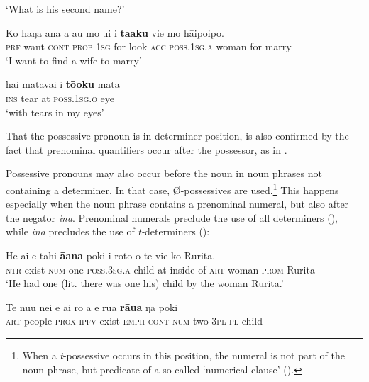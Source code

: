 \glt 
‘What is his second name?’ \textstyleExampleref{[R412.079]} 
\z

\ea\label{ex:6.5}
\gll Ko haŋa {\ꞌ}ana a au mo u{\ꞌ}i i \textbf{tā{\ꞌ}aku} vi{\ꞌ}e mo hāipoipo. \\
\textsc{prf} want \textsc{cont} \textsc{prop} \textsc{1sg} for look \textsc{acc} \textsc{poss.1sg.a} woman for marry \\

\glt 
‘I want to find a wife to marry’ \textstyleExampleref{[R491.005]} 
\z

\ea\label{ex:6.6}
\gll hai matavai {\ꞌ}i \textbf{tō{\ꞌ}oku} mata \\
\textsc{ins} tear at \textsc{poss.1sg.o} eye \\

\glt
‘with tears in my eyes’ \textstyleExampleref{[R221.009]} 
\z

That the possessive pronoun is in determiner position, is also confirmed by the fact that prenominal quantifiers occur after the possessor, as in .

Possessive pronouns may also occur before the noun in noun phrases not containing a determiner. In that case, Ø\nobreakdash-possessives are used.\footnote{\label{fn:285}When a \textit{t}{}-possessive occurs in this position, the numeral is not part of the noun phrase, but predicate of a so-called ‘numerical clause’ ().} This happens especially when the noun phrase contains a prenominal numeral, but also after the negator \textit{{\ꞌ}ina}. Prenominal numerals preclude the use of all determiners (), while \textit{{\ꞌ}ina} precludes the use of \textit{t-}determiners ():

\ea\label{ex:6.7}
\gll He ai e tahi \textbf{{\ꞌ}ā{\ꞌ}ana} poki {\ꞌ}i roto o te vi{\ꞌ}e ko Rurita. \\
\textsc{ntr} exist \textsc{num} one \textsc{poss.3sg.a} child at inside of \textsc{art} woman \textsc{prom} Rurita \\

\glt 
‘He had one (lit. there was one his) child by the woman Rurita.’ \textstyleExampleref{[R309.027]} 
\z

\ea\label{ex:6.8}
\gll Te nu{\ꞌ}u nei e ai rō {\ꞌ}ā e rua \textbf{rāua} ŋā poki \\
\textsc{art} people \textsc{prox} \textsc{ipfv} exist \textsc{emph} \textsc{cont} \textsc{num} two \textsc{3pl} \textsc{pl} child \\


